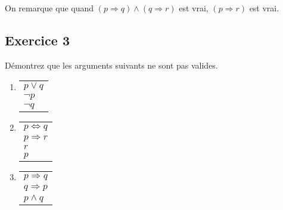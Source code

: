     On remarque que quand $(p \Rightarrow q) \land (q \Rightarrow r)$ est vrai, $(p \Rightarrow r)$ est vrai.
    
    

\subsection*{Exercice 3}
Démontrez que les arguments suivants ne sont pas valides.

\begin{enumerate}
	\item \enter
	
	\begin{flushleft}
	\begin{tabular}{l}
		$p \vee q$ \\
		$\neg p$ \\
	\hline
	$\neg q$
	\end{tabular}
	
\end{flushleft}

	\item \enter
	
	\begin{flushleft}
	\begin{tabular}{l}
		$p \Leftrightarrow q$ \\
		$p \Rightarrow r$ \\
	$r$ \\
	\hline
	$p$
	\end{tabular}
	
\end{flushleft}

	
% 	
% 	

	\item \enter
	
	\begin{flushleft}
	\begin{tabular}{l}
		$p \Rightarrow q$ \\
		$q \Rightarrow p$ \\
	\hline
	$p \wedge q$
	\end{tabular}
	
\end{flushleft}

% 	

\end{enumerate}


